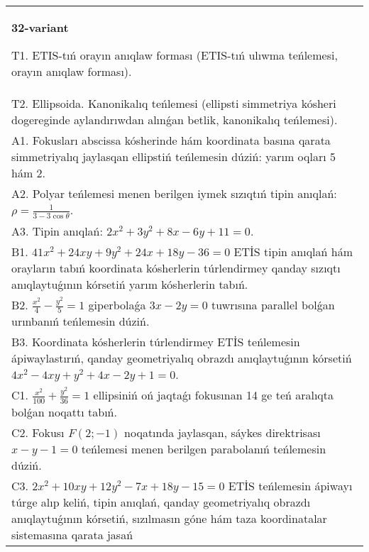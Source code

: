 \documentclass{article}
\begin{document}
\begin{tabular}{m{17cm}}
\textbf{32-variant}
\newline

T1. ETIS-tıń orayın anıqlaw forması (ETIS-tıń ulıwma teńlemesi, orayın anıqlaw forması).\\

T2. Ellipsoida. Kanonikalıq teńlemesi (ellipsti simmetriya kósheri dogereginde aylandırıwdan alınǵan betlik, kanonikalıq teńlemesi).\\

A1. Fokusları abscissa kósherinde hám koordinata basına qarata simmetriyalıq jaylasqan ellipstiń teńlemesin dúziń: yarım oqları 5 hám 2.\\

A2. Polyar teńlemesi menen berilgen iymek sızıqtıń tipin anıqlań: $\rho=\frac{1}{3-3\cos\theta}$.\\

A3. Tipin anıqlań: $2 x^{2}+3 y^{2}+8 x-6 y+11=0$.\\

B1. $41x^{2} + 24xy + 9y^{2} + 24x + 18y - 36 = 0$ ETİS tipin anıqlań hám orayların tabıń koordinata kósherlerin túrlendirmey qanday sızıqtı anıqlaytuǵının kórsetiń yarım kósherlerin tabıń.  \\

B2. $\frac{x^{2}}{4} - \frac{y^{2}}{5} = 1$ giperbolaǵa $3x - 2y = 0$ tuwrısına parallel bolǵan urınbanıń teńlemesin dúziń.  \\

B3. Koordinata kósherlerin túrlendirmey ETİS teńlemesin ápiwaylastırıń, qanday geometriyalıq obrazdı anıqlaytuǵının kórsetiń $4x^{2} - 4xy + y^{2} + 4x - 2y + 1 = 0$.  \\

C1. $\frac{x^{2}}{100} + \frac{y^{2}}{36} = 1$ ellipsiniń oń jaqtaǵı fokusınan 14 ge teń aralıqta bolǵan noqattı tabıń.  \\

C2. Fokusı $F(2; - 1)$ noqatında jaylasqan, sáykes direktrisası $x - y - 1 = 0$ teńlemesi menen berilgen parabolanıń teńlemesin dúziń.  \\

C3. $2x^{2} + 10xy + 12y^{2} - 7x + 18y - 15 = 0$ ETİS teńlemesin ápiwayı túrge alıp keliń, tipin anıqlań, qanday geometriyalıq obrazdı anıqlaytuǵının kórsetiń, sızılmasın góne hám taza koordinatalar sistemasına qarata jasań  \\

\end{tabular}
\vspace{1cm}
\end{document}
